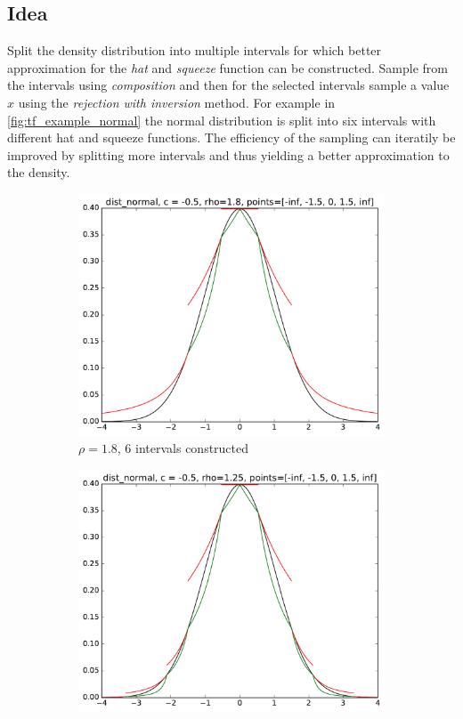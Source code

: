 \documentclass[]{article}
\begin{document}
\subsection{Idea}

Split the density distribution into multiple intervals for which better approximation for the \textit{hat} and \textit{squeeze} function can be constructed. Sample from the intervals using \textit{composition} and then for the selected intervals sample a value $x$ using the \textit{rejection with inversion} method.
For example in \autoref{fig:tf_example_normal} the normal distribution is split into six intervals with different hat and squeeze functions. The efficiency of the sampling can iteratily be improved by splitting more intervals and thus yielding a better approximation to the density.

\begin{figure}
    \centering
    \begin{subfigure}[b]{0.49\textwidth}
        \includegraphics[width=\textwidth]{figs/tf_example_normal_6.pdf}
        \caption{$\rho = 1.8$, 6 intervals constructed}
    \end{subfigure}
    \begin{subfigure}[b]{0.49\textwidth}
        \includegraphics[width=\textwidth]{figs/tf_example_normal_10.pdf}

\end{subfigure}
\end{figure}
\end{document}
